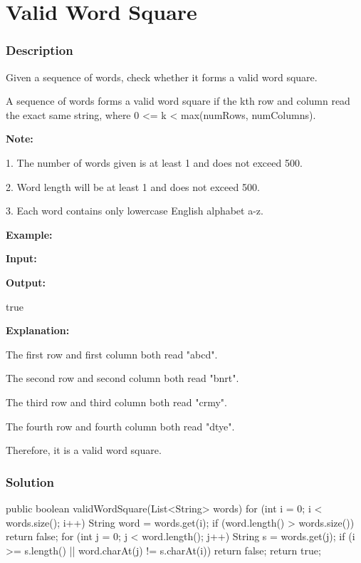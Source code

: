 \newpage

\section{Valid Word Square} %

\subsubsection{Description}
Given a sequence of words, check whether it forms a valid word square.

A sequence of words forms a valid word square if the kth row and column read the exact same string, where 0 <= k < max(numRows, numColumns).

\textbf{Note:}

1. The number of words given is at least 1 and does not exceed 500.

2. Word length will be at least 1 and does not exceed 500.

3. Each word contains only lowercase English alphabet a-z.

\textbf{Example:}

\textbf{Input:}

\begin{Code}
\end{Code}

\textbf{Output:}

true

\textbf{Explanation:}

The first row and first column both read "abcd".

The second row and second column both read "bnrt".

The third row and third column both read "crmy".

The fourth row and fourth column both read "dtye".

Therefore, it is a valid word square.

\subsubsection{Solution}
\begin{Code}
public boolean validWordSquare(List<String> words) {
    for (int i = 0; i < words.size(); i++) {
        String word = words.get(i);
        if (word.length() > words.size()) {
            return false;
        }
        for (int j = 0; j < word.length(); j++) {
            String s = words.get(j);
            if (i >= s.length() || word.charAt(j) != s.charAt(i)) {
                return false;
            }
        }
    }
    return true;
}
\end{Code}

